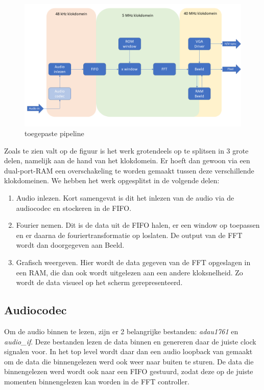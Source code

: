 \documentclass[a4paper,kul]{kulakarticle} %
\begin{document}
\begin{figure}[H]
	\centering
	\includegraphics[width=0.7\linewidth]{Pipeline.png}
	\caption{toegepaste pipeline}
	\label{fig:toegepastePipeline}
\end{figure}

Zoals te zien valt op de figuur is het werk grotendeels op te splitsen in 3 grote delen, namelijk aan de hand van het klokdomein. Er hoeft dan gewoon via een dual-port-RAM een overschakeling te worden gemaakt tussen deze verschillende klokdomeinen. We hebben het werk opgesplitst in de volgende delen:

\begin{enumerate}
	\item Audio inlezen. Kort samengevat is dit het inlezen van de audio via de audiocodec en stockeren in de FIFO.
	\item Fourier nemen. Dit is de data uit de FIFO halen, er een window op toepassen en er daarna de fouriertransformatie op loslaten. De output van de FFT wordt dan doorgegeven aan Beeld.
	\item Grafisch weergeven. Hier wordt de data gegeven van de FFT opgeslagen in een RAM, die dan ook wordt uitgelezen aan een andere kloksnelheid. Zo wordt de data visueel op het scherm gerepresenteerd.
\end{enumerate}

\subsection{Audiocodec}

Om de audio binnen te lezen, zijn er 2 belangrijke bestanden: \textit{adau1761} en \textit{audio\_if}. Deze bestanden lezen de data binnen en genereren daar de juiste clock signalen voor. In het top level wordt daar dan een audio loopback van gemaakt om de data die binnengelezen werd ook weer naar buiten te sturen. De data die binnengelezen werd wordt ook naar een FIFO gestuurd, zodat deze op de juiste momenten binnengelezen kan worden in de FFT controller.
\end{document}
